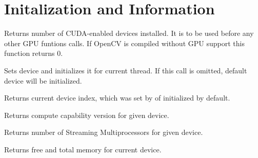 \section{Initalization and Information}


Returns number of CUDA-enabled devices installed. It is to be used before any other GPU funtions calls. If OpenCV is compiled without GPU support this function returns 0. 



Sets device and initializes it for current thread. If this call is omitted, default device will be initialized.

\begin{description}
\end{description}


Returns current device index, which was set by  of initialized by default.



Returns compute capability version for given device.

\begin{description}
\end{description}

Returns number of Streaming Multiprocessors for given device.

\begin{description}
\end{description}


Returns free and total memory for current device.

\begin{description}
\end{description}



